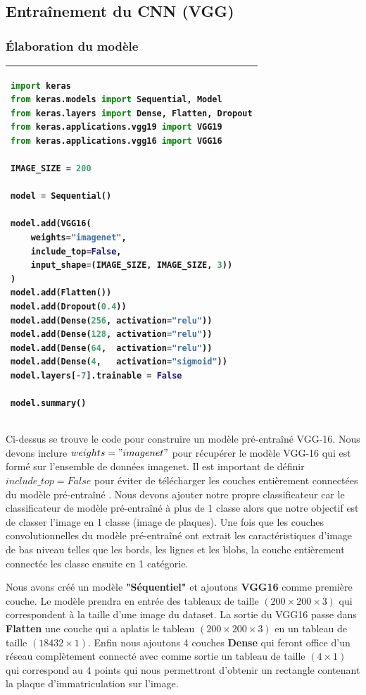 	\subsection{Entraînement  du CNN (VGG)}
	
	\subsubsection{Élaboration du modèle}
	\begin{table}[H]
	\begin{tabular}{|p{\textwidth}|}
		\hline
	\begin{lstlisting}[language=python]
import keras
from keras.models import Sequential, Model
from keras.layers import Dense, Flatten, Dropout
from keras.applications.vgg19 import VGG19
from keras.applications.vgg16 import VGG16
		
IMAGE_SIZE = 200
		
model = Sequential()

model.add(VGG16(
	weights="imagenet", 
	include_top=False, 
	input_shape=(IMAGE_SIZE, IMAGE_SIZE, 3))
)
model.add(Flatten())
model.add(Dropout(0.4))
model.add(Dense(256, activation="relu"))
model.add(Dense(128, activation="relu"))
model.add(Dense(64,  activation="relu"))
model.add(Dense(4,   activation="sigmoid"))
model.layers[-7].trainable = False

model.summary()
	\end{lstlisting}\\
		\hline
	\end{tabular}
	\end{table}
	
	
	Ci-dessus se trouve le code pour construire un modèle pré-entraîné VGG-16. Nous devons inclure { $weights = "imagenet"$} pour récupérer le modèle VGG-16 qui est formé sur l'ensemble de données imagenet. Il est important de définir $include\_top = False$ pour éviter de télécharger les couches entièrement connectées du modèle pré-entraîné \cite{tammina2019transfer}. Nous devons ajouter notre propre classificateur car le classificateur de modèle pré-entraîné à plus de 1 classe alors que notre objectif est de classer l'image en 1 classe (image de plaques). Une fois que les couches convolutionnelles du modèle pré-entraîné ont extrait les caractéristiques d'image de bas niveau telles que les bords, les lignes et les blobs, la couche entièrement connectée les classe ensuite en 1 catégorie.
	
	Nous avons créé un modèle \textbf{"Séquentiel"} et ajoutons \textbf{VGG16} comme première couche. Le modèle prendra en entrée des tableaux de taille $( 200 \times 200 \times 3)$ qui correspondent à la taille d’une image du dataset. La sortie du VGG16 passe dans \textbf{Flatten} une couche qui a aplatis le tableau $( 200 \times 200 \times 3)$ en un tableau de taille $(18432 \times 1)$. Enfin nous ajoutons 4 couches \textbf{Dense} qui feront office d’un réseau complètement connecté avec comme sortie un tableau de taille $(4 \times 1)$ qui correspond au 4 points qui nous permettront d’obtenir un rectangle contenant la plaque d'immatriculation sur l’image. 
	

